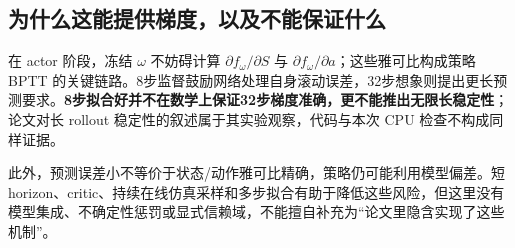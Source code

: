 \subsection{为什么这能提供梯度，以及不能保证什么}
在 actor 阶段，冻结 $\omega$ 不妨碍计算 $\partial f_\omega/\partial S$ 与 $\partial f_\omega/\partial a$；这些雅可比构成策略 BPTT 的关键链路。8步监督鼓励网络处理自身滚动误差，32步想象则提出更长预测要求。\textbf{8步拟合好并不在数学上保证32步梯度准确，更不能推出无限长稳定性}；论文对长 rollout 稳定性的叙述属于其实验观察，代码与本次 CPU 检查不构成同样证据。

此外，预测误差小不等价于状态/动作雅可比精确，策略仍可能利用模型偏差。短 horizon、critic、持续在线仿真采样和多步拟合有助于降低这些风险，但这里没有模型集成、不确定性惩罚或显式信赖域，不能擅自补充为“论文里隐含实现了这些机制”。
